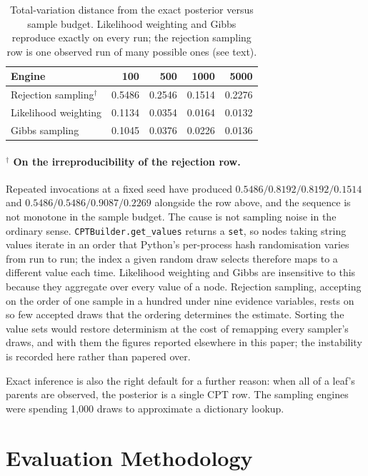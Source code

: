 \documentclass[11pt]{article}
\newcommand{\code}[1]{\texttt{#1}}
\begin{document}
\begin{table}[t]
\centering
\caption{Total-variation distance from the exact posterior versus sample budget.
Likelihood weighting and Gibbs reproduce exactly on every run; the rejection
sampling row is one observed run of many possible ones (see text).}
\label{tab:convergence}
\begin{tabular}{lrrrr}
\toprule
Engine & 100 & 500 & 1000 & 5000 \\
\midrule
Rejection sampling$^{\dagger}$ & 0.5486 & 0.2546 & 0.1514 & 0.2276 \\
Likelihood weighting & 0.1134 & 0.0354 & 0.0164 & 0.0132 \\
Gibbs sampling       & 0.1045 & 0.0376 & 0.0226 & 0.0136 \\
\bottomrule
\end{tabular}
\end{table}

\paragraph{$^{\dagger}$ On the irreproducibility of the rejection row.}
Repeated invocations at a fixed seed have produced
$0.5486 / 0.8192 / 0.8192 / 0.1514$ and $0.5486 / 0.5486 / 0.9087 / 0.2269$
alongside the row above, and the sequence is not monotone in the sample budget.
The cause is not sampling noise in the ordinary sense. \code{CPTBuilder.get\_values}
returns a \code{set}, so nodes taking string values iterate in an order that
Python's per-process hash randomisation varies from run to run; the index a given
random draw selects therefore maps to a different value each time. Likelihood
weighting and Gibbs are insensitive to this because they aggregate over every
value of a node. Rejection sampling, accepting on the order of one sample in a
hundred under nine evidence variables, rests on so few accepted draws that the
ordering determines the estimate. Sorting the value sets would restore
determinism at the cost of remapping every sampler's draws, and with them the
figures reported elsewhere in this paper; the instability is recorded here
rather than papered over.

Exact inference is also the right default for a further reason: when all of a
leaf's parents are observed, the posterior is a single CPT row. The sampling
engines were spending 1{,}000 draws to approximate a dictionary lookup.

\section{Evaluation Methodology}
\end{document}

